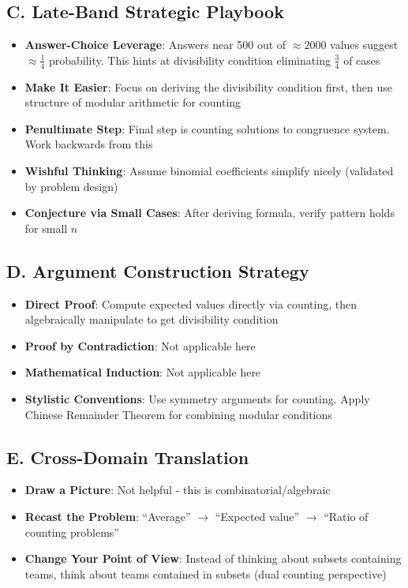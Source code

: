 \documentclass[]{article}
\begin{document}
\begin{strategicbox}
		\subsection*{C. Late-Band Strategic Playbook}
		\begin{itemize}[leftmargin=*]
			\item \textbf{Answer-Choice Leverage}: Answers near 500 out of $\approx 2000$ values suggest $\approx \frac{1}{4}$ probability. This hints at divisibility condition eliminating $\frac{3}{4}$ of cases
			\item \textbf{Make It Easier}: Focus on deriving the divisibility condition first, then use structure of modular arithmetic for counting
			\item \textbf{Penultimate Step}: Final step is counting solutions to congruence system. Work backwards from this
			\item \textbf{Wishful Thinking}: Assume binomial coefficients simplify nicely (validated by problem design)
			\item \textbf{Conjecture via Small Cases}: After deriving formula, verify pattern holds for small $n$
		\end{itemize}
		
		\subsection*{D. Argument Construction Strategy}
		\begin{itemize}[leftmargin=*]
			\item \textbf{Direct Proof}: Compute expected values directly via counting, then algebraically manipulate to get divisibility condition
			\item \textbf{Proof by Contradiction}: Not applicable here
			\item \textbf{Mathematical Induction}: Not applicable here
			\item \textbf{Stylistic Conventions}: Use symmetry arguments for counting. Apply Chinese Remainder Theorem for combining modular conditions
		\end{itemize}
		
		\subsection*{E. Cross-Domain Translation}
		\begin{itemize}[leftmargin=*]
			\item \textbf{Draw a Picture}: Not helpful - this is combinatorial/algebraic
			\item \textbf{Recast the Problem}: ``Average'' $\rightarrow$ ``Expected value'' $\rightarrow$ ``Ratio of counting problems''
			\item \textbf{Change Your Point of View}: Instead of thinking about subsets containing teams, think about teams contained in subsets (dual counting perspective)
		\end{itemize}
	\end{strategicbox}
	
\end{document}
